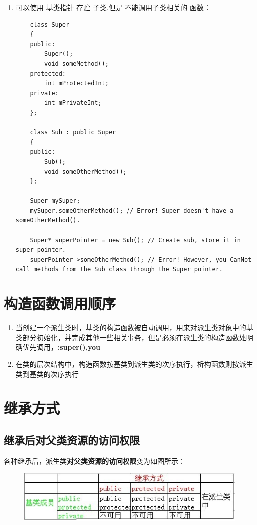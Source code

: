 \documentclass[UTF8,a4paper,12pt]{ctexbook} %
\begin{document}
\begin{enumerate}[fullwidth,itemindent=2em,label=(\arabic*)]
	       \item 可以使用 基类指针 存贮 子类.但是 不能调用子类相关的 函数：
		       \begin{lstlisting}
	class Super
	{
	public:
		Super();
		void someMethod();
	protected:
		int mProtectedInt;
	private:
		int mPrivateInt;
	};
	
	class Sub : public Super
	{
	public:
		Sub();
		void someOtherMethod();
	};
	
	Super mySuper;
	mySuper.someOtherMethod(); // Error! Super doesn't have a someOtherMethod().
	
	Super* superPointer = new Sub(); // Create sub, store it in super pointer.
	superPointer->someOtherMethod(); // Error! However, you CanNot call methods from the Sub class through the Super pointer. 
		       \end{lstlisting}
	       \end{enumerate}
     
\section{构造函数调用顺序}
	       \begin{enumerate}[fullwidth,itemindent=2em,label=(\arabic*)]
	       	 \item 当创建一个派生类时，基类的构造函数被自动调用，用来对派生类对象中的基类部分初始化，并完成其他一些相关事务，但是必须在派生类的构造函数处明确优先调用\textbf{，:super(),you}
	       	 \item 在类的层次结构中，构造函数按基类到派生类的次序执行，析构函数则按派生类到基类的次序执行
	       \end{enumerate}
 
\section{继承方式}
	\subsection{继承后对父类资源的访问权限}
		各种继承后，派生类\textbf{对父类资源的访问权限}变为如图所示：
		\begin{figure}[h]
			\centering 
			\includegraphics[scale = 0.8]{derive.png}
		\end{figure}   
		   
\end{document}
